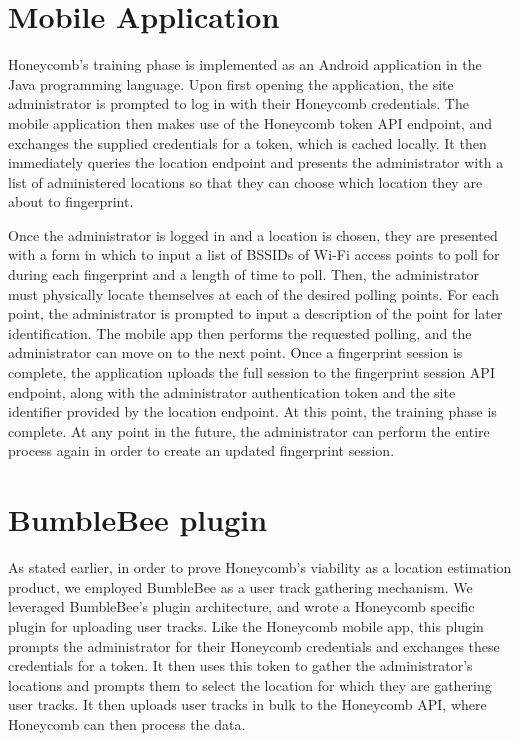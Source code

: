 \section{Mobile Application}
%

Honeycomb's training phase is implemented as an Android application in the Java programming language. Upon first opening the application, the site administrator is prompted to log in with their Honeycomb credentials. The mobile application then makes use of the Honeycomb token API endpoint, and exchanges the supplied credentials for a token, which is cached locally. It then immediately queries the location endpoint and presents the administrator with a list of administered locations so that they can choose which location they are about to fingerprint. 

Once the administrator is logged in and a location is chosen, they are presented with a form in which to input a list of BSSIDs of Wi-Fi access points to poll for during each fingerprint and a length of time to poll. Then, the administrator must physically locate themselves at each of the desired polling points. For each point, the administrator is prompted to input a description of the point for later identification. The mobile app then performs the requested polling, and the administrator can move on to the next point. Once a fingerprint session is complete, the application uploads the full session to the fingerprint session API endpoint, along with the administrator authentication token and the site identifier provided by the location endpoint. At this point, the training phase is complete. At any point in the future, the administrator can perform the entire process again in order to create an updated fingerprint session.


\section{BumbleBee plugin}
%


As stated earlier, in order to prove Honeycomb's viability as a location estimation product, we employed BumbleBee as a user track gathering mechanism. We leveraged BumbleBee's plugin architecture, and wrote a Honeycomb specific plugin for uploading user tracks. Like the Honeycomb mobile app, this plugin prompts the administrator for their Honeycomb credentials and exchanges these credentials for a token. It then uses this token to gather the administrator's locations and prompts them to select the location for which they are gathering user tracks. It then uploads user tracks in bulk to the Honeycomb API, where Honeycomb can then process the data.
